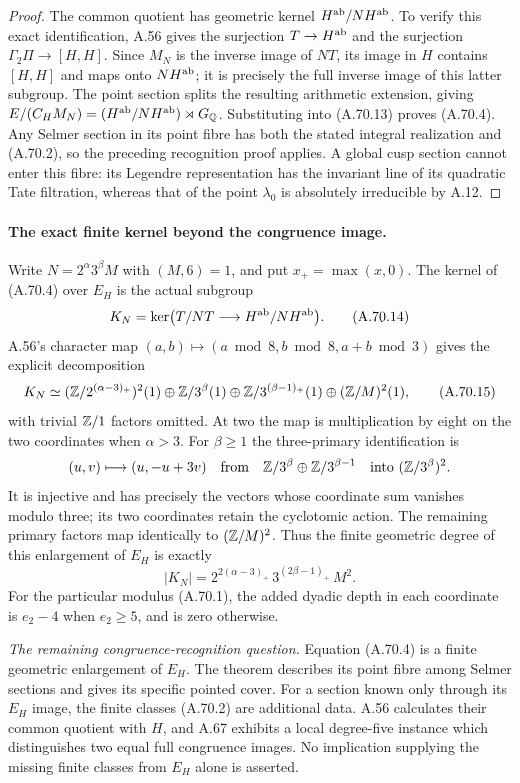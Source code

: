 \begin{proof}
The common quotient has geometric kernel
$H^{\rm ab}/NH^{\rm ab}$.
To verify this exact identification, A.56 gives
the surjection $T\to H^{\rm ab}$ and the
surjection $\Gamma_2\Pi\to[H,H]$.
Since $M_N$ is the inverse image of $NT$, its
image in $H$ contains $[H,H]$ and maps onto
$NH^{\rm ab}$; it is precisely the full inverse
image of this latter subgroup.
The point section splits the resulting arithmetic
extension, giving
$E/(C_HM_N)=(H^{\rm ab}/NH^{\rm ab})\rtimes G_\mathbb Q$.
Substituting into (A.70.13) proves (A.70.4).
Any Selmer section in its point fibre has both
the stated integral realization and (A.70.2),
so the preceding recognition proof applies.
A global cusp section cannot enter this fibre:
its Legendre representation has the invariant line
of its quadratic Tate filtration, whereas that of
the point $\lambda_0$ is absolutely irreducible by A.12.
\end{proof}

\paragraph{The exact finite kernel beyond the congruence image.}
Write $N=2^\alpha3^\beta M$ with $(M,6)=1$, and put
$x_+=\max(x,0)$.
The kernel of (A.70.4) over $E_H$ is the actual subgroup
\[
 K_N=\ker\bigl(T/NT\longrightarrow
                         H^{\rm ab}/NH^{\rm ab}\bigr).
\tag{A.70.14}
\]
A.56's character map
$(a,b)\mapsto(a\bmod8,b\bmod8,a+b\bmod3)$
gives the explicit decomposition
\[
 K_N\simeq
 (\mathbb Z/2^{(\alpha-3)_+})^2(1)
 \oplus\mathbb Z/3^\beta(1)
 \oplus\mathbb Z/3^{(\beta-1)_+}(1)
 \oplus(\mathbb Z/M)^2(1),
\tag{A.70.15}
\]
with trivial $\mathbb Z/1$ factors omitted.
At two the map is multiplication by eight on the
two coordinates when $\alpha>3$.
For $\beta\ge1$ the three-primary identification is
\[
 (u,v)\longmapsto(u,-u+3v)
 \quad\text{from}\quad
 \mathbb Z/3^\beta\oplus\mathbb Z/3^{\beta-1}
                   \quad\text{into }(\mathbb Z/3^\beta)^2.
\]
It is injective and has precisely the vectors whose
coordinate sum vanishes modulo three; its two
coordinates retain the cyclotomic action.
The remaining primary factors map identically to
$(\mathbb Z/M)^2$.  Thus the finite geometric degree of
this enlargement of $E_H$ is exactly
\[
                       |K_N|=
       2^{2(\alpha-3)_+}\,3^{(2\beta-1)_+}\,M^2.
\tag{A.70.16}
\]
For the particular modulus (A.70.1), the added
dyadic depth in each coordinate is $e_2-4$ when
$e_2\ge5$, and is zero otherwise.

\noindent\emph{The remaining congruence-recognition question.}
Equation (A.70.4) is a finite geometric enlargement
of $E_H$.  The theorem describes its point fibre
among Selmer sections and gives its specific
pointed cover.
For a section known only through its $E_H$ image,
the finite classes (A.70.2) are additional data.
A.56 calculates their common quotient with $H$,
and A.67 exhibits a local degree-five instance
which distinguishes two equal full congruence
images.  No implication supplying the missing
finite classes from $E_H$ alone is asserted.
